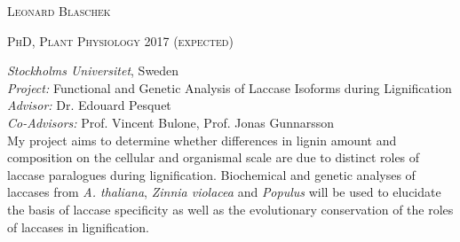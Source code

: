\documentclass[11pt]{article}
\begin{document}
	\setlength\parindent{15pt}
\begin{center}
	\huge{\textsc{Leonard Blaschek}}
	\vspace*{0.2cm}
\end{center}

\vspace{0.1cm}

\textsc{\large{PhD, Plant Physiology} \hfill \textsc{2017 \textnormal{(expected)}}}
\begin{addmargin}[24pt]{0pt}
	\textit{Stockholms Universitet}, Sweden \\
	\textit{Project:} Functional and Genetic Analysis of Laccase Isoforms during Lignification \\
	\textit{Advisor:} Dr. Edouard Pesquet \\
	\textit{Co-Advisors:} Prof. Vincent Bulone, Prof. Jonas Gunnarsson
	\vspace{0.1cm} \\
	\small{My project aims to determine whether differences in lignin amount and composition on the cellular and organismal scale are due to distinct roles of laccase paralogues during lignification. Biochemical and genetic analyses of laccases from \textit{A. thaliana}, \textit{Zinnia violacea} and \textit{Populus} will be used to elucidate the basis of laccase specificity as well as the evolutionary conservation of the roles of laccases in lignification.}
\end{addmargin}
\vspace{0.2cm}
\end{document}
